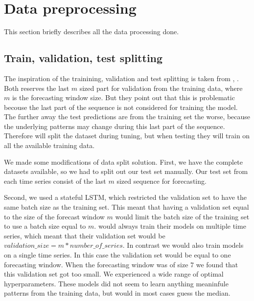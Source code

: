 \section{Data preprocessing}
\label{section:Data:Preprocessing}
This section briefly describes all the data processing done.

\subsection{Train, validation, test splitting}

The inspiration of the trainining, validation and test splitting is taken from
\cite{Bandara2019}, \cite{Hewamalage2021}.
Both reserves the last $m$ sized part for validation from the training data,
where $m$ is the forecasting window size.
But \cite{Hewamalage2021} they point out that this is problematic becouse the last part of the sequence is
not considered for training the model.
The further away the test predictions are from the training set the worse,
because the underlying patterns may change during this last part of the sequence.
Therefore \cite{Hewamalage2021} will split the dataset during tuning, but when testing
they will train on all the available training data.

We made some modifications of \cite{Hewamalage2021} data split solution.
First, we have the complete datasets available, so we had to split out our
test set manually. Our test set from each time series consist of the last $m$ sized
sequence for forecasting.

Second, we used a stateful LSTM, which restricted the validation set to have the
same batch size as the training set. This meant that having a validation set equal
to the size of the forecast window $m$ would limit the batch size of the training set
to use a batch size equal to $m$. \cite{Bandara2019} would always
train their models on multiple time series, which meant that their validation set would
be $validation\_size = m * number\_of\_series$. In contrast we would also train models on
a single time series. In this case the validation set would be equal to one forecasting window.
When the forecasting window was of size 7 we found that this validation set got too small.
We experienced a wide range of optimal hyperparameters. These models did not seem to
learn anything meaninfule patterns from the training data, but would in most cases guess
the median.

